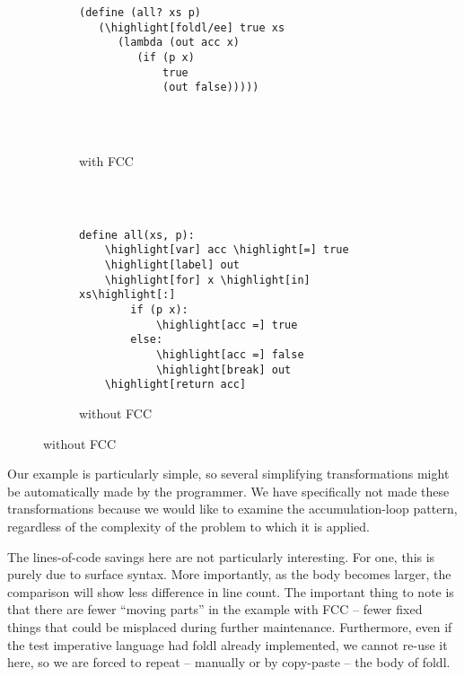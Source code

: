 \documentclass[11pt]{article}
\newcommand{\highlight}[1]{\colorbox{black!30!white}{#1}}
\begin{document}
\begin{figure}[H]
\caption{Accumulation-loop pattern codified}
\label{fig:foldl/ee}


\begin{subfigure}[b]{0.5\textwidth}
\begin{Verbatim}[commandchars=\\\[\]]
(define (all? xs p)
   (\highlight[foldl/ee] true xs
      (lambda (out acc x)
         (if (p x)
             true
             (out false)))))




\end{Verbatim}
\caption{with FCC}
\end{subfigure}
~
\begin{subfigure}[b]{0.5\textwidth}
\begin{Verbatim}[commandchars=\\\[\]]

define all(xs, p):
    \highlight[var] acc \highlight[=] true
    \highlight[label] out
    \highlight[for] x \highlight[in] xs\highlight[:]
        if (p x):
            \highlight[acc =] true
        else:
            \highlight[acc =] false
            \highlight[break] out
    \highlight[return acc]
\end{Verbatim}
\caption{without FCC}
\end{subfigure}


\end{figure}

Our example is particularly simple, so several simplifying transformations might be automatically made by the programmer.
We have specifically not made these transformations because we would like to examine the accumulation-loop pattern, regardless of the complexity of the problem to which it is applied.

The lines-of-code savings here are not particularly interesting.
For one, this is purely due to surface syntax.
More importantly, as the body becomes larger, the comparison will show less difference in line count.
The important thing to note is that there are fewer ``moving parts'' in the example with FCC -- fewer fixed things that could be misplaced during further maintenance.
Furthermore, even if the test imperative language had foldl already implemented, we cannot re-use it here, so we are forced to repeat -- manually or by copy-paste -- the body of foldl.
\end{document}
